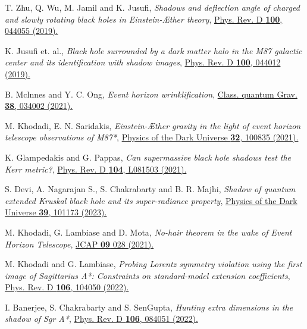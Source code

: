 \documentclass[aps,amsmath,amssymb,showpacs,showkeys]{revtex4}
\begin{document}
\begin{thebibliography}{99}
T. Zhu, Q. Wu, M. Jamil and K. Jusufi, \textit{Shadows and deflection angle of charged and slowly rotating black holes in Einstein-Æther theory}, \href{https://journals.aps.org/prd/abstract/10.1103/PhysRevD.100.044055}{Phys. Rev. D \textbf{100}, 044055 (2019).}

K. Jusufi et. al., \textit{Black hole surrounded by a dark matter halo in the M87 galactic center and its identification with shadow images}, \href{https://journals.aps.org/prd/abstract/10.1103/PhysRevD.100.044012}{Phys. Rev. D \textbf{100}, 044012 (2019).}



B. Mclnnes and Y. C. Ong, \textit{Event horizon wrinklification}, \href{https://iopscience.iop.org/article/10.1088/1361-6382/abce45}{Class. quantum Grav. \textbf{38}, 034002 (2021).}

M. Khodadi, E. N. Saridakis, \textit{Einstein-Æther gravity in the light of event horizon telescope observations of M87*}, \href{https://www.sciencedirect.com/science/article/abs/pii/S2212686421000662?via%3Dihub}{Physics of the Dark Universe \textbf{32}, 100835 (2021).}

K. Glampedakis and G. Pappas, \textit{Can supermassive black hole shadows test the Kerr metric?}, \href{https://journals.aps.org/prd/abstract/10.1103/PhysRevD.104.L081503}{Phys. Rev. D \textbf{104}, L081503 (2021).}

S. Devi, A. Nagarajan S., S. Chakrabarty and B. R. Majhi, \textit{Shadow of quantum extended Kruskal black hole and its super-radiance property}, \href{https://www.sciencedirect.com/science/article/abs/pii/S2212686423000079?via%3Dihub}{Physics of the Dark Universe \textbf{39}, 101173 (2023).}

M. Khodadi, G. Lambiase and D. Mota, \textit{No-hair theorem in the wake of Event Horizon Telescope}, \href{https://iopscience.iop.org/article/10.1088/1475-7516/2021/09/028}{JCAP \textbf{09} 028 (2021).}

M. Khodadi and G. Lambiase, \textit{Probing Lorentz symmetry violation using the first image of Sagittarius A*: Constraints on standard-model extension coefficients}, \href{https://journals.aps.org/prd/abstract/10.1103/PhysRevD.106.104050}{Phys. Rev. D \textbf{106}, 104050 (2022).}

I. Banerjee, S. Chakrabarty and S. SenGupta, \textit{Hunting extra dimensions in the shadow of Sgr A*}, \href{https://journals.aps.org/prd/abstract/10.1103/PhysRevD.106.084051}{Phys. Rev. D \textbf{106}, 084051 (2022).}


\end{thebibliography}
\end{document}
